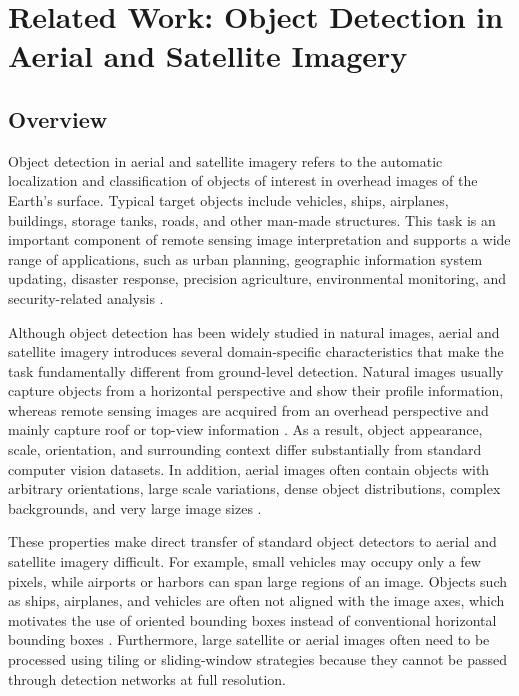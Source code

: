 \section{Related Work: Object Detection in Aerial and Satellite Imagery}


\subsection{Overview}

Object detection in aerial and satellite imagery refers to the automatic localization and classification of objects of interest in overhead images of the Earth's surface. Typical target objects include vehicles, ships, airplanes, buildings, storage tanks, roads, and other man-made structures. This task is an important component of remote sensing image interpretation and supports a wide range of applications, such as urban planning, geographic information system updating, disaster response, precision agriculture, environmental monitoring, and security-related analysis \cite{li2020object,ding2021object}.

Although object detection has been widely studied in natural images, aerial and satellite imagery introduces several domain-specific characteristics that make the task fundamentally different from ground-level detection. Natural images usually capture objects from a horizontal perspective and show their profile information, whereas remote sensing images are acquired from an overhead perspective and mainly capture roof or top-view information \cite{li2020object}. As a result, object appearance, scale, orientation, and surrounding context differ substantially from standard computer vision datasets. In addition, aerial images often contain objects with arbitrary orientations, large scale variations, dense object distributions, complex backgrounds, and very large image sizes \cite{ding2021object}.

These properties make direct transfer of standard object detectors to aerial and satellite imagery difficult. For example, small vehicles may occupy only a few pixels, while airports or harbors can span large regions of an image. Objects such as ships, airplanes, and vehicles are often not aligned with the image axes, which motivates the use of oriented bounding boxes instead of conventional horizontal bounding boxes \cite{ding2021object}. Furthermore, large satellite or aerial images often need to be processed using tiling or sliding-window strategies because they cannot be passed through detection networks at full resolution.


